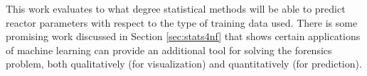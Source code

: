This work evaluates to what degree statistical methods will be able to predict
reactor parameters with respect to the type of training data used.  There is
some promising work discussed in Section \ref{sec:stats4nf} that shows certain
applications of machine learning can provide an additional tool for solving the
forensics problem, both qualitatively (for visualization) and quantitatively
(for prediction).
